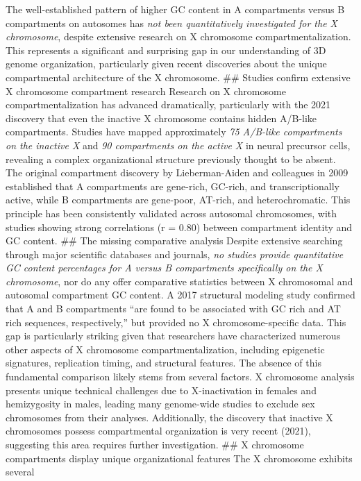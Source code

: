 \documentclass[
  a4paper,
  openany]{scrbook}
\begin{document}
The well-established pattern of higher GC content in A compartments
versus B compartments on autosomes has \emph{not been quantitatively
investigated for the X chromosome}, despite extensive research on X
chromosome compartmentalization. This represents a significant and
surprising gap in our understanding of 3D genome organization,
particularly given recent discoveries about the unique compartmental
architecture of the X chromosome. \#\# Studies confirm extensive X
chromosome compartment research Research on X chromosome
compartmentalization has advanced dramatically, particularly with the
2021 discovery that even the inactive X chromosome contains hidden
A/B-like compartments. Studies have mapped approximately \emph{75
A/B-like compartments on the inactive X} and \emph{90 compartments on
the active X} in neural precursor cells, revealing a complex
organizational structure previously thought to be absent. The original
compartment discovery by Lieberman-Aiden and colleagues in 2009
established that A compartments are gene-rich, GC-rich, and
transcriptionally active, while B compartments are gene-poor, AT-rich,
and heterochromatic. This principle has been consistently validated
across autosomal chromosomes, with studies showing strong correlations
(r = 0.80) between compartment identity and GC content. \#\# The missing
comparative analysis Despite extensive searching through major
scientific databases and journals, \emph{no studies provide quantitative
GC content percentages for A versus B compartments specifically on the X
chromosome}, nor do any offer comparative statistics between X
chromosomal and autosomal compartment GC content. A 2017 structural
modeling study confirmed that A and B compartments ``are found to be
associated with GC rich and AT rich sequences, respectively,'' but
provided no X chromosome-specific data. This gap is particularly
striking given that researchers have characterized numerous other
aspects of X chromosome compartmentalization, including epigenetic
signatures, replication timing, and structural features. The absence of
this fundamental comparison likely stems from several factors. X
chromosome analysis presents unique technical challenges due to
X-inactivation in females and hemizygosity in males, leading many
genome-wide studies to exclude sex chromosomes from their analyses.
Additionally, the discovery that inactive X chromosomes possess
compartmental organization is very recent (2021), suggesting this area
requires further investigation. \#\# X chromosome compartments display
unique organizational features The X chromosome exhibits several
\end{document}
